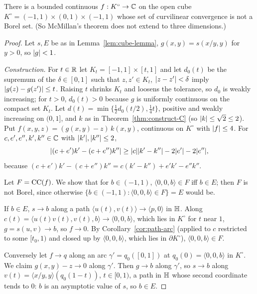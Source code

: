 \begin{theorem}\label{thm:cube}
There is a bounded continuous $f:K^\circ\to\mathbb{C}$ on the open cube $K^\circ=(-1,1)\times(0,1)\times(-1,1)$ whose set of curvilinear convergence
is not a Borel set. (So McMillan's theorem does not extend to three dimensions.)
\end{theorem}
\begin{proof}
Let $s,E$ be as in Lemma~\ref{lem:cube-lemma}, $g(x,y)=s(x/y,y)$ for $y>0$, so $\lvert g\rvert<1$.

\emph{Construction.} For $t\in\mathbb{R}$ let $K_t=[-1,1]\times[t,1]$ and let $d_0(t)$ be the supremum of the $\delta\in[0,1]$ such that $z,z'\in K_t$,
$\lvert z-z'\rvert<\delta$ imply $\lvert g(z)-g(z')\rvert\le t$. Raising $t$ shrinks $K_t$ and loosens the tolerance, so $d_0$ is weakly increasing; for $t>0$,
$d_0(t)>0$ because $g$ is uniformly continuous on the compact set $K_t$. Let $d(t)=\min\{\frac12d_0(t/2),\frac14t\}$, positive and weakly increasing
on $(0,1]$, and $k$ as in Theorem~\ref{thm:construct-C} (so $\lvert k\rvert\le\sqrt2\le2$). Put $f(x,y,z)=(g(x,y)-z)\,k(x,y)$, continuous on $K^\circ$ with
$\lvert f\rvert\le4$. For $c,e',e'',k',k''\in\mathbb{C}$ with $\lvert k'\rvert,\lvert k''\rvert\le2$,
\begin{equation}\label{eq:cube1}
\lvert (c+e')k'-(c+e'')k''\rvert\ge\lvert c\rvert\lvert k'-k''\rvert-2\lvert e'\rvert-2\lvert e''\rvert,
\end{equation}
because $(c+e')k'-(c+e'')k''=c(k'-k'')+e'k'-e''k''$.

Let $F=\operatorname{CC}(f)$. We show that for $b\in(-1,1)$, $\langle0,0,b\rangle\in F$ iff $b\in E$; then $F$ is not Borel, since otherwise
$\{b\in(-1,1):\langle0,0,b\rangle\in F\}=E$ would be.

If $b\in E$, $s\to b$ along a path $\langle u(t),v(t)\rangle\to\langle p,0\rangle$ in $\mathbb{H}$. Along $c(t)=\langle u(t)v(t),v(t),b\rangle\to\langle0,0,b\rangle$,
which lies in $K^\circ$ for $t$ near $1$, $g=s(u,v)\to b$, so $f\to0$. By Corollary~\ref{cor:path-arc} (applied to $c$ restricted to some $[t_0,1)$
and closed up by $\langle0,0,b\rangle$, which lies in $\partial K^\circ$), $\langle0,0,b\rangle\in F$.

Conversely let $f\to q$ along an arc $\gamma'=q_0([0,1])$ at $q_0(0)=\langle0,0,b\rangle$ in $K^\circ$. We claim $g(x,y)-z\to0$ along $\gamma'$.
Then $g\to b$ along $\gamma'$, so $s\to b$ along $v(t)=\langle x/y,y\rangle(q_0(1-t))$, $t\in[0,1)$, a path in $\mathbb{H}$ whose second coordinate tends
to $0$: $b$ is an asymptotic value of $s$, so $b\in E$.


\end{proof}
